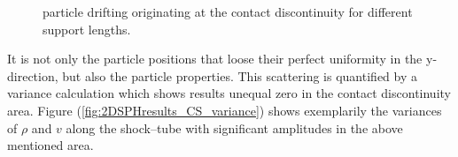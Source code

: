 \documentclass[11pt,a4paper,twoside]{report}
\begin{document}
\begin{figure}[!htbp]
\centering
\label{fig:2DSPHresults_CS_drifting}

\caption[Particle drifting for 2D distribution]{particle drifting originating at the contact discontinuity for different support lengths.}

\end{figure}

It is not only the particle positions that loose their perfect uniformity in the y- direction, but also the particle properties. This scattering is quantified by a variance calculation which shows results unequal zero in the contact discontinuity area.
Figure (\ref{fig:2DSPHresults_CS_variance}) shows exemplarily the variances of $\rho$ and $v$ along the shock--tube with significant amplitudes in the above mentioned area.
\end{document}
